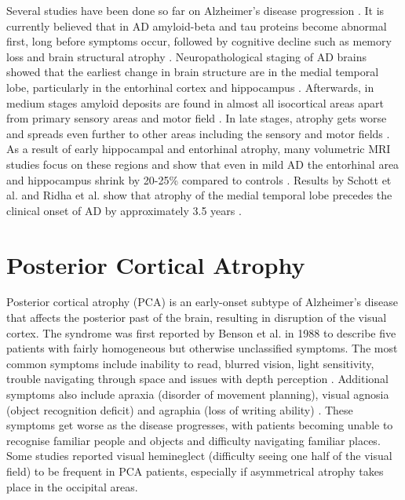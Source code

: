 Several studies have been done so far on Alzheimer's disease progression \cite{jack2010hypothetical, ridha2006tracking,fox1999correlation, scahill2002mapping, braak1991neuropathological,schott2003assessing}. It is currently believed that in AD amyloid-beta and tau proteins become abnormal first, long before symptoms occur, followed by cognitive decline such as memory loss and brain structural atrophy \cite{jack2010hypothetical,jack2013tracking}.  Neuropathological staging of AD brains showed that the earliest change in brain structure are in the medial temporal lobe, particularly in the entorhinal cortex and hippocampus \cite{braak1991neuropathological}. Afterwards, in medium stages amyloid deposits are found in almost all isocortical areas apart from primary sensory areas and motor field \cite{braak1991neuropathological}. In late stages, atrophy gets worse and spreads even further to other areas including the sensory and motor fields \cite{braak1991neuropathological}. As a result of early hippocampal and entorhinal atrophy, many volumetric MRI studies focus on these regions and show that even in mild AD the entorhinal area and hippocampus shrink by 20-25\% compared to controls \cite{jack1997medial,lehericy1994amygdalohippocampal,juottonen1999comparative,bobinski1999histological}. Results by Schott et al. \cite{schott2003assessing} and Ridha et al. \cite{ridha2006tracking} show that atrophy of the medial temporal lobe precedes the clinical onset of AD by approximately 3.5 years \cite{schott2003assessing}. 



\section{Posterior Cortical Atrophy}
\label{sec:pca}

Posterior cortical atrophy (PCA) is an early-onset subtype of Alzheimer's disease that affects the posterior past of the brain, resulting in disruption of the visual cortex. The syndrome was first reported by Benson et al. \cite{benson1988posterior} in 1988 to describe five patients with fairly homogeneous but otherwise unclassified symptoms.  The most common symptoms include inability to read, blurred vision, light sensitivity, trouble navigating through space and issues with depth perception \cite{crutch2012posterior,borruat2013posterior}. Additional symptoms also include apraxia (disorder of movement planning), visual agnosia (object recognition deficit) and agraphia (loss of writing ability) \cite{benson1988posterior,goethals2001posterior}. These symptoms get worse as the disease progresses, with patients becoming unable to recognise familiar people and objects and difficulty navigating familiar places. Some studies \cite{andrade2010visual,andrade2012visuospatial,andrade2013visuospatial} reported visual hemineglect (difficulty seeing one half of the visual field) to be frequent in PCA patients, especially if asymmetrical atrophy takes place in the occipital areas. 

